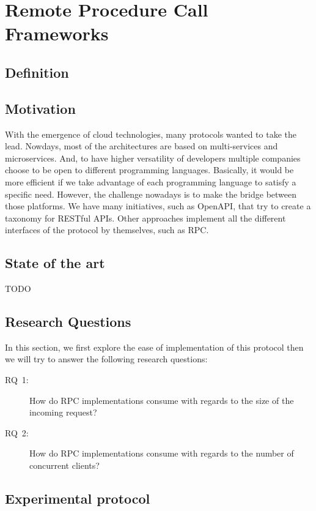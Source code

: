 \section{Remote Procedure Call Frameworks}

\subsection{Definition}

\subsection{Motivation}
With the emergence of cloud technologies, many protocols wanted to take the lead.
Nowdays, most of the architectures are based on multi-services and microservices.
And, to have higher versatility of developers multiple companies choose to be open to different programming languages.
Basically, it would be more efficient if we take advantage of each programming language to satisfy a specific need.
However, the challenge nowadays is to make the bridge between those platforms.
We have many initiatives, such as OpenAPI, that try to create a taxonomy for RESTful APIs.
Other approaches implement all the different interfaces of the protocol by themselves, such as RPC.

\subsection{State of the art}
TODO


\subsection{Research Questions}
In this section, we first explore the ease of implementation of this protocol then we will try to answer the following research questions:
\begin{description}
    \item[\textsc{RQ}~1:] How do RPC implementations consume with regards to the size of the incoming request?
    \item[\textsc{RQ}~2:] How do RPC implementations consume with regards to the number of concurrent clients?
\end{description}

\subsection{Experimental protocol}

